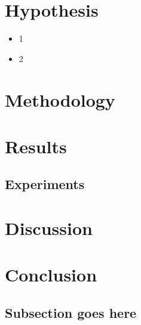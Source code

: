 \documentclass[journal]{IEEEtran}
\begin{document}
\section{Hypothesis}
\begin{itemize}
  \item 1
  \item 2
\end{itemize}

\section{Methodology}

\section{Results}
\subsection{Experiments}

\section{Discussion}

\section{Conclusion}
\subsection{Subsection goes here}


%
\end{document}
